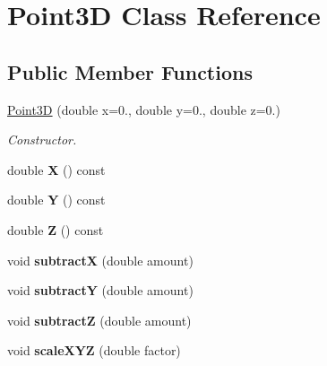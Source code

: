 \hypertarget{classPoint3D}{}\section{Point3\+D Class Reference}
\label{classPoint3D}
\subsection*{Public Member Functions}
\begin{DoxyCompactItemize}
\item 
\hypertarget{classPoint3D_af4ed168ed883ea404ed363c79408e830}{}\hyperlink{classPoint3D_af4ed168ed883ea404ed363c79408e830}{Point3\+D} (double x=0., double y=0., double z=0.)\label{classPoint3D_af4ed168ed883ea404ed363c79408e830}

\begin{DoxyCompactList}\small\item\em Constructor. \end{DoxyCompactList}\item 
\hypertarget{classPoint3D_ab637223cff9a13531cb82bea70fdf2be}{}double {\bfseries X} () const \label{classPoint3D_ab637223cff9a13531cb82bea70fdf2be}

\item 
\hypertarget{classPoint3D_a0321eefbe2d003c6e5de81557a938711}{}double {\bfseries Y} () const \label{classPoint3D_a0321eefbe2d003c6e5de81557a938711}

\item 
\hypertarget{classPoint3D_a9de6ff7d82e55b70d3c59c24cf54f2d2}{}double {\bfseries Z} () const \label{classPoint3D_a9de6ff7d82e55b70d3c59c24cf54f2d2}

\item 
\hypertarget{classPoint3D_a96df020b15ce63cf0f924a97a211249f}{}void {\bfseries subtract\+X} (double amount)\label{classPoint3D_a96df020b15ce63cf0f924a97a211249f}

\item 
\hypertarget{classPoint3D_a9a3acf7fc11af7d98095dab46959e9e5}{}void {\bfseries subtract\+Y} (double amount)\label{classPoint3D_a9a3acf7fc11af7d98095dab46959e9e5}

\item 
\hypertarget{classPoint3D_a06ee218dba5a7f939e866137be1f58d2}{}void {\bfseries subtract\+Z} (double amount)\label{classPoint3D_a06ee218dba5a7f939e866137be1f58d2}

\item 
\hypertarget{classPoint3D_a275cd316a3094a013b3a0c1d46ec6034}{}void {\bfseries scale\+X\+Y\+Z} (double factor)\label{classPoint3D_a275cd316a3094a013b3a0c1d46ec6034}

\end{DoxyCompactItemize}
